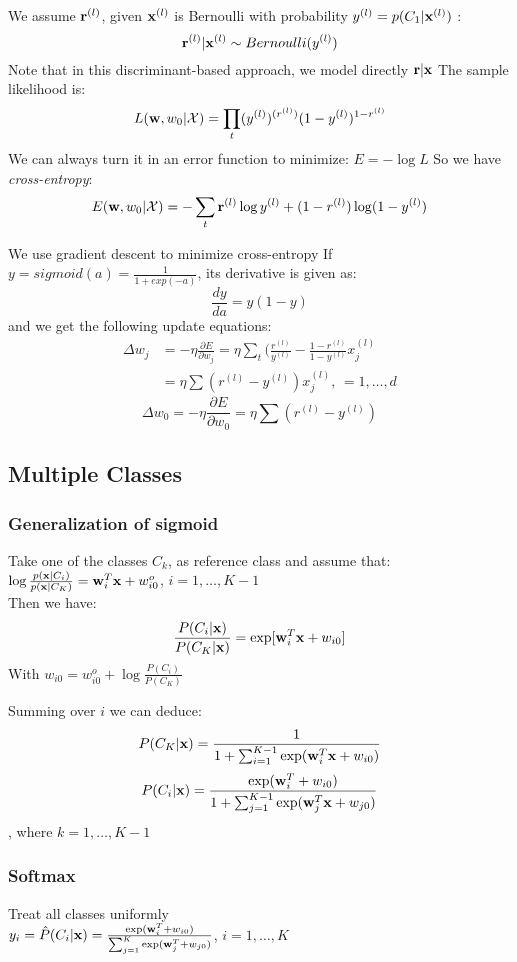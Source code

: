 \begin{description}
        We assume $\mathbf{r}^{(l)}$, given $\mathbf{x}^{(l)}$ is Bernoulli with probability $y^{(l)} =
        p(C_1|\mathbf{x}^{(l)})$ :
        \[\mathbf{r}^{(l)}|\mathbf{x}^{(l)} \sim Bernoulli(y^{(l)}) \]
        Note that in this discriminant-based approach, we model directly $\mathbf{r}|\mathbf{x}$
        The sample likelihood is:
        \[ L(\mathbf{w},w_0|\mathcal{X}) = \prod_t(y^{(l)})^{(r^{(l)})}(1-y^{(l)})^{1-r^{(l)}}
            \]
        We can always turn it in an error function to minimize: $E = -\log L$
        So we have \emph{cross-entropy}:
        \[ E(\mathbf{w}, w_0| \mathcal{X}) = -\sum_t \mathbf{r}^{(l)}\log y^{(l)} + (1-r^{(l)})\log(1 - y^{(l)}) \]

        We use gradient descent to minimize cross-entropy 
        If $y = sigmoid(a) = \frac{1}{1 + exp(-a)}$, its derivative is given as:
        \[ \frac{dy}{da} = y(1-y) \]
        and we get the following update equations:
        \begin{align*}
            \Delta w_j & = -\eta \frac{\partial E}{\partial w_j} = \eta \sum_t
            ({\frac{r^{(l)}}{y^{(l)}}} - \frac{1-r^{(l)}}{1-y^{(l)}}x^{(l)}_j \\
            & = \eta \sum(r^{(l)} - y^{(l)}) x^{(l)}_j\mbox{, }= 1,\dots, d 
        \end{align*}
        \[
            \Delta w_0 = -\eta \frac{\partial E}{\partial w_0} = \eta\sum(r^{(l)} -
            y^{(l)}) 
        \]
\end{description}
\subsection{Multiple Classes}
\subsubsection{Generalization of sigmoid}
    Take one of the classes $C_k$, as reference class
        and assume that: \\
        $ \log\frac{p(\mathbf{x}|C_i)}{p(\mathbf{x}|C_K)} = \mathbf{w}_i^T\mathbf{x}+ w_{i0}^o $,
        $i=1,\dots,K-1$\\
        Then we have:
        \[ \frac{P(C_i|\mathbf{x})}{P(C_K|\mathbf{x})} = \exp[\mathbf{w}_i^T\mathbf{x}+w_{i0}] \]
        With $w_{i0} = w_{i0}^o + \log\frac{P(C_i)}{P(C_K)}$

     Summing over $i$ we can deduce: 
         \[P(C_K|\mathbf{x}) =
         \frac{1}{1+\sum_{i=1}^{K-1}\exp(\mathbf{w}_i^T\mathbf{x} + w_{i0})}\]
        \[P(C_i|\mathbf{x})
        =\frac{\exp(\mathbf{w}_i^T+w_{i0})}{1+\sum_{j=1}^{K-1}\exp(\mathbf{w}_j^T\mathbf{x}+w_{j0})}\],
    where $k=1,\dots, K-1$
\subsubsection{Softmax}
    Treat all classes uniformly\\ $y_i = \hat{P}(C_i|\mathbf{x}) =
        \frac{\exp(\mathbf{w}_i^T+w_{i0})}{\sum_{j=1}^K\exp(\mathbf{w}_j^T+w_{j0})}$,
        $i=1,\dots, K$
